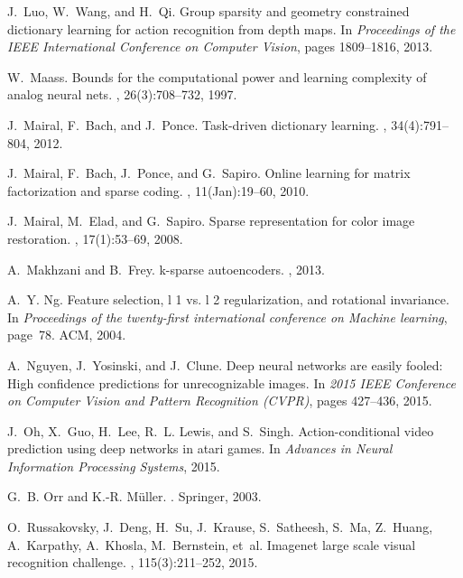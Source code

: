 \documentclass[10pt,twocolumn,letterpaper]{article}
\begin{document}
\begin{thebibliography}{10}
J.~Luo, W.~Wang, and H.~Qi.
\newblock Group sparsity and geometry constrained dictionary learning for
  action recognition from depth maps.
\newblock In {\em Proceedings of the IEEE International Conference on Computer
  Vision}, pages 1809--1816, 2013.

W.~Maass.
\newblock Bounds for the computational power and learning complexity of analog
  neural nets.
, 26(3):708--732, 1997.

J.~Mairal, F.~Bach, and J.~Ponce.
\newblock Task-driven dictionary learning.
,
  34(4):791--804, 2012.

J.~Mairal, F.~Bach, J.~Ponce, and G.~Sapiro.
\newblock Online learning for matrix factorization and sparse coding.
, 11(Jan):19--60, 2010.

J.~Mairal, M.~Elad, and G.~Sapiro.
\newblock Sparse representation for color image restoration.
, 17(1):53--69, 2008.

A.~Makhzani and B.~Frey.
\newblock k-sparse autoencoders.
, 2013.

A.~Y. Ng.
\newblock Feature selection, l 1 vs. l 2 regularization, and rotational
  invariance.
\newblock In {\em Proceedings of the twenty-first international conference on
  Machine learning}, page~78. ACM, 2004.

A.~Nguyen, J.~Yosinski, and J.~Clune.
\newblock Deep neural networks are easily fooled: High confidence predictions
  for unrecognizable images.
\newblock In {\em 2015 IEEE Conference on Computer Vision and Pattern
  Recognition (CVPR)}, pages 427--436, 2015.

J.~Oh, X.~Guo, H.~Lee, R.~L. Lewis, and S.~Singh.
\newblock Action-conditional video prediction using deep networks in atari
  games.
\newblock In {\em Advances in Neural Information Processing Systems}, 2015.

G.~B. Orr and K.-R. M{\"u}ller.
.
\newblock Springer, 2003.

O.~Russakovsky, J.~Deng, H.~Su, J.~Krause, S.~Satheesh, S.~Ma, Z.~Huang,
  A.~Karpathy, A.~Khosla, M.~Bernstein, et~al.
\newblock Imagenet large scale visual recognition challenge.
, 115(3):211--252,
  2015.


\end{thebibliography}
\end{document}
